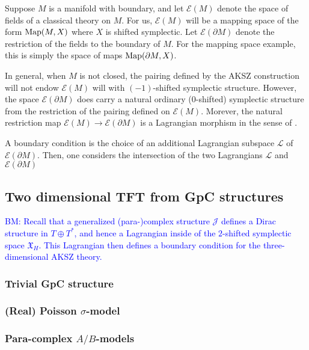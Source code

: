 \documentclass{article}
\newcommand{\TT}{{T\oplus T^*}}
\newcommand{\JJ}{\mathcal{J}}
\newcommand{\XX}{\mathfrak{X}}
\newcommand{\cE}{\mathcal{E}}
\theoremstyle{definition}
\theoremstyle{remark}
\def\brian{\textcolor{blue}{BM: }\textcolor{blue}}
\begin{document}
Suppose $M$ is a manifold with boundary, and let $\cE(M)$ denote the space of fields of a classical theory on $M$. 
For us, $\cE(M)$ will be a mapping space of the form ${\rm Map}(M, X)$ where $X$ is shifted symplectic. 
Let $\cE(\partial M)$ denote the restriction of the fields to the boundary of $M$. 
For the mapping space example, this is simply the space of maps ${\rm Map}(\partial M, X)$.

In general, when $M$ is not closed, the pairing defined by the AKSZ construction will not endow $\cE(M)$ will with $(-1)$-shifted symplectic structure. 
However, the space $\cE(\partial M)$ does carry a natural ordinary ($0$-shifted) symplectic structure from the restriction of the pairing defined on $\cE(M)$. 
Morever, the natural restriction map $\cE(M) \to \cE(\partial M)$ is a Lagrangian morphism in the sense of \cite{PTVV}. 

\def\cL{\mathcal{L}}

A boundary condition is the choice of an additional Lagrangian subspace $\cL$ of $\cE(\partial M)$.
Then, one considers the intersection of the two Lagrangians $\cL$ and $\cE(\partial M)$ 


\subsection{Two dimensional TFT from GpC structures}

\brian{Recall that a generalized (para-)complex structure $\JJ$ defines a Dirac structure in $\TT$, and hence a Lagrangian inside of the $2$-shifted symplectic space $\XX_H$.  
This Lagrangian then defines a boundary condition for the three-dimensional AKSZ theory. }

\subsubsection*{Trivial GpC structure}

\subsubsection*{(Real) Poisson $\sigma$-model}

\subsubsection*{Para-complex $A/B$-models}
\end{document}
